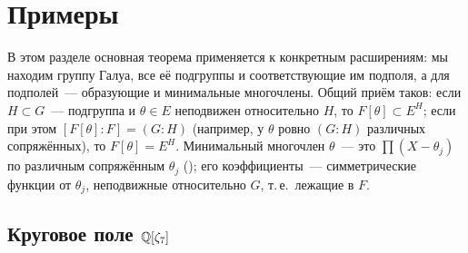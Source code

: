 \makeatletter
{}
\makeatother
\section{Примеры}

В этом разделе основная теорема применяется к конкретным расширениям: мы находим группу Галуа, все её подгруппы и
соответствующие им подполя, а для подполей~--- образующие и минимальные многочлены. Общий приём таков: если
$H\subset G$~--- подгруппа и $\theta\in E$ неподвижен относительно $H$, то $F[\theta]\subset E^H$; если при этом
$[F[\theta]:F]=(G:H)$ (например, у $\theta$ ровно $(G:H)$ различных сопряжённых), то $F[\theta]=E^H$. Минимальный многочлен
$\theta$~--- это $\prod(X-\theta_j)$ по различным сопряжённым $\theta_j$ (); его коэффициенты~--- симметрические
функции от $\theta_j$, неподвижные относительно $G$, т.\,е.\ лежащие в $F$.

\subsection*{Круговое поле $\mathbb Q[\zeta_7]$}

